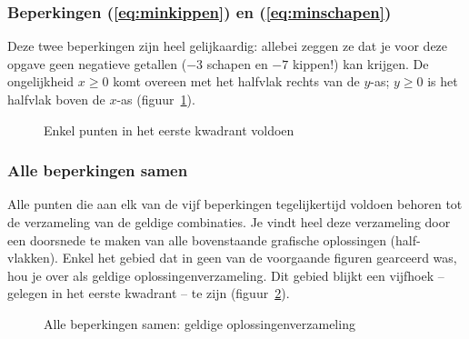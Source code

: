 \subsubsection{Beperkingen (\ref{eq:minkippen}) en (\ref{eq:minschapen})}
Deze twee beperkingen zijn heel gelijkaardig: allebei zeggen
ze dat je voor deze opgave geen negatieve getallen ($-3$ schapen
en $-7$ kippen!) kan krijgen. De ongelijkheid $x \geqslant 0$ komt overeen met het halfvlak rechts van de
$y$-as; $y \geqslant 0$ is het halfvlak boven de $x$-as
(figuur~\ref{fig:eenkwadrant}).
\begin{figure}[htbp]
    \centering
{}
    \caption{Enkel punten in het eerste kwadrant voldoen}
    \label{fig:eenkwadrant}
\end{figure}



\subsubsection{Alle beperkingen samen}
Alle punten die aan elk van de vijf beperkingen tegelijkertijd voldoen
behoren tot de verzameling van de geldige combinaties. Je vindt
heel deze verzameling door een doorsnede te maken van alle bovenstaande
grafische oplossingen (half-vlakken). Enkel het gebied dat in
geen van de voorgaande figuren gearceerd was, hou je over als
geldige oplossingenverzameling. Dit gebied blijkt een vijfhoek
-- gelegen in het eerste kwadrant --
te zijn (figuur~\ref{fig:allebep}).
\begin{figure}[htbp]
    \centering
{}
    \caption{Alle beperkingen samen: geldige oplossingenverzameling}
    \label{fig:allebep}
\end{figure}



